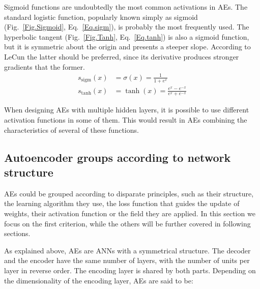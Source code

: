 \documentclass[preprint,5p,compress]{elsarticle}
\begin{document}
Sigmoid functions are  undoubtedly the most common activations in AEs. The standard logistic function, popularly known simply as  sigmoid (Fig.~\ref{Fig.Sigmoid}, Eq.~\ref{Eq.sigm}), is probably the most frequently used. The hyperbolic tangent (Fig.~\ref{Fig.Tanh}, Eq.~\ref{Eq.tanh}) is also a sigmoid function, but it is symmetric about the origin and presents a steeper slope. According to LeCun \cite{EfficientBackprop} the latter should be preferred, since its derivative produces stronger gradients that the former.
\begin{align}
  \label{Eq.sigm} s_{\mathrm{sigm}}(x) &= \sigma(x) = \frac{1}{1+e^x} \\
  \label{Eq.tanh} s_{\mathrm{tanh}}(x) &= \tanh(x) = \frac{e^x-e^{-x}}{e^x+e^{-x}}
\end{align}


When designing AEs with multiple hidden layers, it is possible to use different activation functions in some of them. This would result in AEs combining the characteristics of several of these functions.


\subsection{Autoencoder groups according to network structure}

AEs could be grouped according to disparate principles, such as their structure, the learning algorithm they use, the loss function that guides the update of weights, their activation function or the field they are applied. In this section we focus on the first criterion, while the others will be further covered in following sections. 

As explained above, AEs are ANNs with a symmetrical structure. The decoder and the encoder have the same number of layers, with the number of units per layer in reverse order. The encoding layer is shared by both parts. Depending on the dimensionality of the encoding layer, AEs are said to be:
\end{document}
